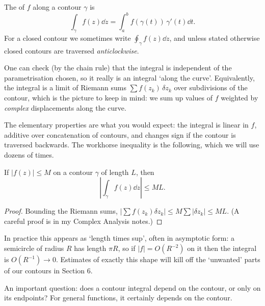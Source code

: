 \begin{definition}
	The  of $f$ along a contour $\gamma$ is
	$$
	\int_\gamma f(z) \dd z = \int_a^b f(\gamma(t)) \, \gamma'(t) \dd t.
	$$
	For a closed contour we sometimes write $\oint_\gamma f(z) \dd z$, and unless stated otherwise closed contours are traversed \emph{anticlockwise}.
\end{definition}

One can check (by the chain rule) that the integral is independent of the parametrisation chosen, so it really is an integral `along the curve'. Equivalently, the integral is a limit of Riemann sums $\sum f(z_k) \, \delta z_k$ over subdivisions of the contour, which is the picture to keep in mind: we sum up values of $f$ weighted by \emph{complex} displacements along the curve.

The elementary properties are what you would expect: the integral is linear in $f$, additive over concatenation of contours, and changes sign if the contour is traversed backwards. The workhorse inequality is the following, which we will use dozens of times.

\begin{lemma}
	If $|f(z)| \leq M$ on a contour $\gamma$ of length $L$, then
	$$
	\left| \int_\gamma f(z) \dd z \right| \leq ML.
	$$
\end{lemma}
\begin{proof}
	Bounding the Riemann sums, $|\sum f(z_k) \delta z_k| \leq M \sum |\delta z_k| \leq ML$. (A careful proof is in my Complex Analysis notes.)
\end{proof}

In practice this appears as `length times sup', often in asymptotic form: a semicircle of radius $R$ has length $\pi R$, so if $|f| = O(R^{-2})$ on it then the integral is $O(R^{-1}) \to 0$. Estimates of exactly this shape will kill off the `unwanted' parts of our contours in Section 6.

An important question: does a contour integral depend on the contour, or only on its endpoints? For general functions, it certainly depends on the contour.

